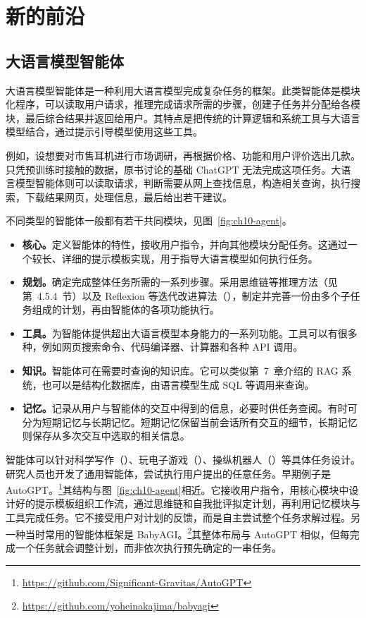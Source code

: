 \section{新的前沿}
\label{sec:ch10-new-frontiers}

\subsection{大语言模型智能体}
\label{sec:ch10-agents}
大语言模型智能体是一种利用大语言模型完成复杂任务的框架。此类智能体是模块化程序，可以读取用户请求，推理完成请求所需的步骤，创建子任务并分配给各模块，最后综合结果并返回给用户。其特点是把传统的计算逻辑和系统工具与大语言模型结合，通过提示引导模型使用这些工具。

例如，设想要对市售耳机进行市场调研，再根据价格、功能和用户评价选出几款。只凭预训练时接触的数据，原书讨论的基础 ChatGPT 无法完成这项任务。大语言模型智能体则可以读取请求，判断需要从网上查找信息，构造相关查询，执行搜索，下载结果网页，处理信息，最后给出若干建议。

不同类型的智能体一般都有若干共同模块，见图~\ref{fig:ch10-agent}。



\begin{keypoint}
\begin{itemize}
\item \textbf{核心。}定义智能体的特性，接收用户指令，并向其他模块分配任务。这通过一个较长、详细的提示模板实现，用于指导大语言模型如何执行任务。
\item \textbf{规划。}确定完成整体任务所需的一系列步骤。采用思维链等推理方法（见第~4.5.4~节）以及 Reflexion 等迭代改进算法（），制定并完善一份由多个子任务组成的计划，再由智能体的各项功能执行。
\item \textbf{工具。}为智能体提供超出大语言模型本身能力的一系列功能。工具可以有很多种，例如网页搜索命令、代码编译器、计算器和各种 API 调用。
\item \textbf{知识。}智能体可在需要时查询的知识库。它可以类似第~7~章介绍的 RAG 系统，也可以是结构化数据库，由语言模型生成 SQL 等调用来查询。
\item \textbf{记忆。}记录从用户与智能体的交互中得到的信息，必要时供任务查阅。有时可分为短期记忆与长期记忆。短期记忆保留当前会话所有交互的细节，长期记忆则保存从多次交互中选取的相关信息。
\end{itemize}
\end{keypoint}

智能体可以针对科学写作（）、玩电子游戏（）、操纵机器人（）等具体任务设计。研究人员也开发了通用智能体，尝试执行用户提出的任意任务。早期例子是 AutoGPT。\footnote{\url{https://github.com/Significant-Gravitas/AutoGPT}}其结构与图~\ref{fig:ch10-agent}相近。它接收用户指令，用核心模块中设计好的提示模板组织工作流，通过思维链和自我批评拟定计划，再利用记忆模块与工具完成任务。它不接受用户对计划的反馈，而是自主尝试整个任务求解过程。另一种当时常用的智能体框架是 BabyAGI。\footnote{\url{https://github.com/yoheinakajima/babyagi}}其整体布局与 AutoGPT 相似，但每完成一个任务就会调整计划，而非依次执行预先确定的一串任务。

